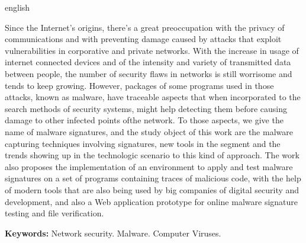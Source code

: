 \documentclass[
	12pt,				%
	openright,			%
	oneside,			%
	a4paper,			%
	english,			%
	french,				%
	spanish,			%
	brazil				%
	]{abntex2}
\renewcommand{\listquadroname}{Lista de Quadros} %
\begin{document}
\begin{resumo}[Abstract]
\begin{otherlanguage*}{english}

Since the Internet's origins, there's a great preoccupation with the privacy of communications and with preventing damage caused by attacks that exploit vulnerabilities in corporative and private networks. With the increase in usage of internet connected devices and of the intensity and variety of transmitted data between people, the number of security flaws in networks is still worrisome and tends to keep growing. However, packages of some programs used in those attacks, known as malware, have traceable aspects that when incorporated to the search methods of security systems, might help detecting them before causing damage to other infected points ofthe network. To those aspects, we give the name of malware signatures, and the study object of this work are the malware capturing techniques involving signatures, new tools in the segment and the trends showing up in the technologic scenario to this kind of approach. The work also proposes the implementation of an environment to apply and test malware signatures on a set of programs containing traces of malicious code, with the help of modern tools that are also being used by big companies of digital security and development, and also a Web application prototype for online malware signature testing and file verification.

\textbf{Keywords:} Network security. Malware. Computer Viruses.

 \end{otherlanguage*}
\end{resumo}

\listoffigures*
\cleardoublepage

\listoftables*
\cleardoublepage

\newpage %
\addcontentsline{toc}{chapter}{\listquadroname} %
\listofquadros %
\cleardoublepage

\end{document}
